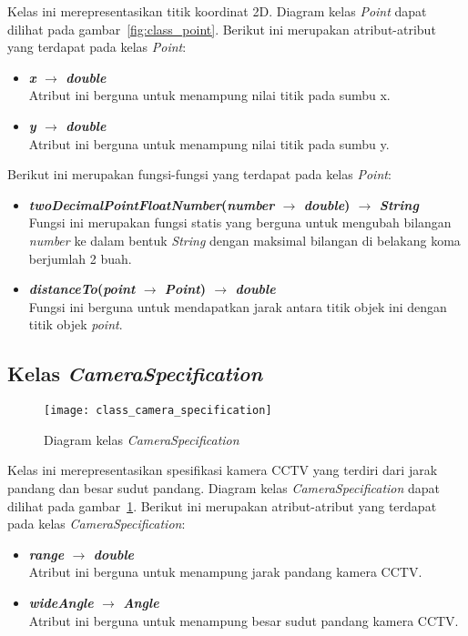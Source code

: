 Kelas ini merepresentasikan titik koordinat 2D. Diagram kelas \textit{Point} dapat dilihat pada gambar~\ref{fig:class_point}. Berikut ini merupakan atribut-atribut yang terdapat pada kelas \textit{Point}:
\begin{itemize}
	\item \textbf{\textit{x} \(\rightarrow\) \textit{double}}\\
	Atribut ini berguna untuk menampung nilai titik pada sumbu x.
	\item \textbf{\textit{y} \(\rightarrow\) \textit{double}}\\
	Atribut ini berguna untuk menampung nilai titik pada sumbu y.
\end{itemize}
Berikut ini merupakan fungsi-fungsi yang terdapat pada kelas \textit{Point}:
\begin{itemize}
	\item \textbf{\textit{twoDecimalPointFloatNumber}(\textit{number} \(\rightarrow\) \textit{double}) \(\rightarrow\) \textit{String}}\\
	Fungsi ini merupakan fungsi statis yang berguna untuk mengubah bilangan \textit{number} ke dalam bentuk \textit{String} dengan maksimal bilangan di belakang koma berjumlah 2 buah.
	\item \textbf{\textit{distanceTo}(\textit{point} \(\rightarrow\) \textit{Point}) \(\rightarrow\) \textit{double}}\\
	Fungsi ini berguna untuk mendapatkan jarak antara titik objek ini dengan titik objek \textit{point}.
\end{itemize}

\subsection{Kelas \textit{CameraSpecification}}
\begin{figure}[H]
	\centering  
	\texttt{[image: class\_camera\_specification]}
	\caption[Diagram kelas \textit{CameraSpecification}]{Diagram kelas \textit{CameraSpecification}}
	\label{fig:class_camera_specification}
\end{figure}

Kelas ini merepresentasikan spesifikasi kamera CCTV yang terdiri dari jarak pandang dan besar sudut pandang. Diagram kelas \textit{CameraSpecification} dapat dilihat pada gambar~\ref{fig:class_camera_specification}. Berikut ini merupakan atribut-atribut yang terdapat pada kelas \textit{CameraSpecification}:
\begin{itemize}
	\item \textbf{\textit{range} \(\rightarrow\) \textit{double}}\\
	Atribut ini berguna untuk menampung jarak pandang kamera CCTV.
	\item \textbf{\textit{wideAngle} \(\rightarrow\) \textit{Angle}}\\
	Atribut ini berguna untuk menampung besar sudut pandang kamera CCTV.
\end{itemize}

